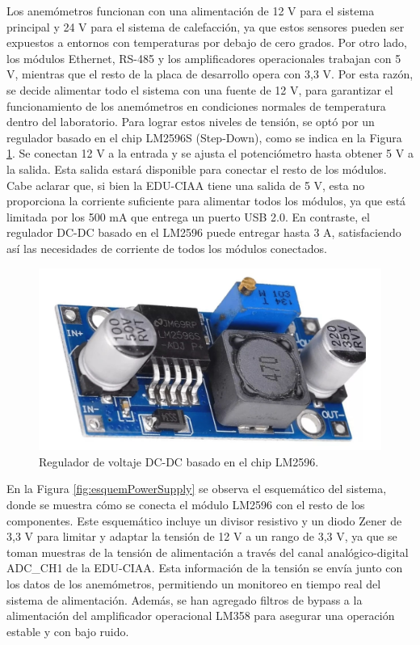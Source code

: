 Los anemómetros funcionan con una alimentación de 12 \unit{\volt} para el sistema principal y 24 \unit{\volt} para el sistema de calefacción, ya que estos sensores pueden ser expuestos a entornos con temperaturas por debajo de cero grados. Por otro lado, los módulos Ethernet, RS-485 y los amplificadores operacionales trabajan con 5 \unit{\volt}, mientras que el resto de la placa de desarrollo opera con 3,3 \unit{\volt}. Por esta razón, se decide alimentar todo el sistema con una fuente de 12 \unit{\volt}, para garantizar el funcionamiento de los anemómetros en condiciones normales de temperatura dentro del laboratorio. Para lograr estos niveles de tensión, se optó por un regulador basado en el chip LM2596S (Step-Down), como se indica en la Figura \ref{fig:StepDowmLM2596S}. Se conectan 12 \unit{\volt} a la entrada y se ajusta el potenciómetro hasta obtener 5 \unit{\volt} a la salida. Esta salida estará disponible para conectar el resto de los módulos. Cabe aclarar que, si bien la EDU-CIAA tiene una salida de 5 \unit{\volt}, esta no proporciona la corriente suficiente para alimentar todos los módulos, ya que está limitada por los 500 \unit{\milli\ampere} que entrega un puerto USB 2.0. En contraste, el regulador DC-DC basado en el LM2596 puede entregar hasta 3 \unit{\ampere}, satisfaciendo así las necesidades de corriente de todos los módulos conectados. 

\begin{figure}[H]
    \centering
    \includegraphics[width=0.5\linewidth]{Figuras/datalogger/Hardware/StepDowmLM2596S.jpg}
    \caption{Regulador de voltaje DC-DC basado en el chip LM2596.}
    \label{fig:StepDowmLM2596S}
\end{figure}

En la Figura \ref{fig:esquemPowerSupply} se observa el esquemático del sistema, donde se muestra cómo se conecta el módulo LM2596 con el resto de los componentes. Este esquemático incluye un divisor resistivo y un diodo Zener de 3,3 \unit{\volt} para limitar y adaptar la tensión de 12 \unit{\volt} a un rango de 3,3 \unit{\volt}, ya que se toman muestras de la tensión de alimentación a través del canal analógico-digital ADC\_CH1 de la EDU-CIAA. Esta información de la tensión se envía junto con los datos de los anemómetros, permitiendo un monitoreo en tiempo real del sistema de alimentación. Además, se han agregado filtros de bypass a la alimentación del amplificador operacional LM358 para asegurar una operación estable y con bajo ruido.

